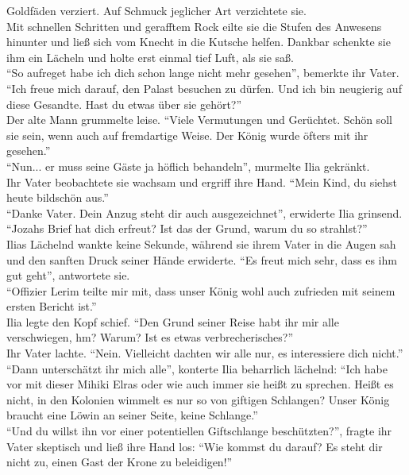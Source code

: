 Goldfäden verziert. Auf Schmuck jeglicher Art verzichtete sie. \\
Mit schnellen Schritten und gerafftem Rock eilte sie die Stufen des Anwesens hinunter und ließ sich 
vom Knecht in die Kutsche helfen. Dankbar schenkte sie ihm ein Lächeln und holte erst einmal tief 
Luft, als sie saß.\\
``So aufreget habe ich dich schon lange nicht mehr gesehen'', bemerkte ihr Vater.\\
``Ich freue mich darauf, den Palast besuchen zu dürfen. Und ich bin neugierig auf diese Gesandte. 
Hast du etwas über sie gehört?''\\
Der alte Mann grummelte leise. ``Viele Vermutungen und Gerüchtet. Schön soll sie sein, wenn auch 
auf fremdartige Weise. Der König wurde öfters mit ihr gesehen.''\\
``Nun... er muss seine Gäste ja höflich behandeln'', murmelte Ilia gekränkt.\\
Ihr Vater beobachtete sie wachsam und ergriff ihre Hand. ``Mein Kind, du siehst heute bildschön 
aus.''\\
``Danke Vater. Dein Anzug steht dir auch ausgezeichnet'', erwiderte Ilia grinsend.\\
``Jozahs Brief hat dich erfreut? Ist das der Grund, warum du so strahlst?''\\
Ilias Lächelnd wankte keine Sekunde, während sie ihrem Vater in die Augen sah und den sanften Druck 
seiner Hände erwiderte. ``Es freut mich sehr, dass es ihm gut geht'', antwortete sie.\\
``Offizier Lerim teilte mir mit, dass unser König wohl auch zufrieden mit seinem ersten Bericht 
ist.''\\
Ilia legte den Kopf schief. ``Den Grund seiner Reise habt ihr mir alle verschwiegen, hm? Warum? Ist 
es etwas verbrecherisches?''\\
Ihr Vater lachte. ``Nein. Vielleicht dachten wir alle nur, es interessiere dich nicht.''\\
``Dann unterschätzt ihr mich alle'', konterte Ilia beharrlich lächelnd: ``Ich habe vor mit dieser 
Mihiki Elras oder wie auch immer sie heißt zu sprechen. Heißt es nicht, in den Kolonien wimmelt es 
nur so von giftigen Schlangen? Unser König braucht eine Löwin an seiner Seite, keine Schlange.''\\
``Und du willst ihn vor einer potentiellen Giftschlange beschützten?'', fragte ihr Vater skeptisch 
und ließ ihre Hand los: ``Wie kommst du darauf? Es steht dir nicht zu, einen Gast der Krone zu 
beleidigen!''\\
